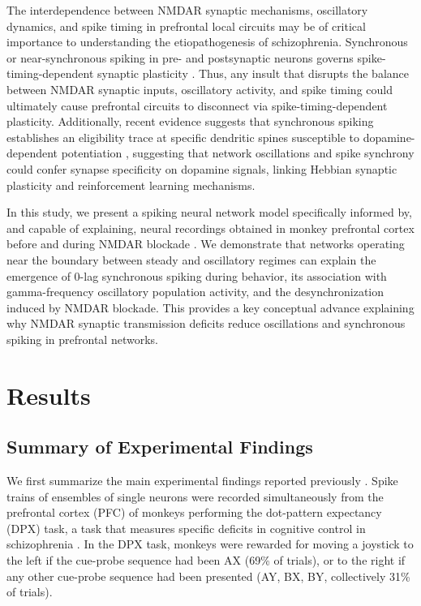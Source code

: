 \documentclass[12pt]{article}
\begin{document}
The interdependence between NMDAR synaptic mechanisms, oscillatory dynamics, and spike timing in prefrontal local circuits may be of critical importance to understanding the etiopathogenesis of schizophrenia. Synchronous or near-synchronous spiking in pre- and postsynaptic neurons governs spike-timing-dependent synaptic plasticity \citep{DanPoo2004}. Thus, any insult that disrupts the balance between NMDAR synaptic inputs, oscillatory activity, and spike timing could ultimately cause prefrontal circuits to disconnect via spike-timing-dependent plasticity. Additionally, recent evidence suggests that synchronous spiking establishes an eligibility trace at specific dendritic spines susceptible to dopamine-dependent potentiation \citep{He2015, Kasai2021, Yagishita2014}, suggesting that network oscillations and spike synchrony could confer synapse specificity on dopamine signals, linking Hebbian synaptic plasticity and reinforcement learning mechanisms.

In this study, we present a spiking neural network model specifically informed by, and capable of explaining, neural recordings obtained in monkey prefrontal cortex before and during NMDAR blockade \citep{Zick2018}. We demonstrate that networks operating near the boundary between steady and oscillatory regimes can explain the emergence of 0-lag synchronous spiking during behavior, its association with gamma-frequency oscillatory population activity, and the desynchronization induced by NMDAR blockade. This provides a key conceptual advance explaining why NMDAR synaptic transmission deficits reduce oscillations and synchronous spiking in prefrontal networks.

\section{Results}

\subsection{Summary of Experimental Findings}

We first summarize the main experimental findings reported previously \citep{Zick2018}. Spike trains of ensembles of single neurons were recorded simultaneously from the prefrontal cortex (PFC) of monkeys performing the dot-pattern expectancy (DPX) task, a task that measures specific deficits in cognitive control in schizophrenia \citep{Jones2010}. In the DPX task, monkeys were rewarded for moving a joystick to the left if the cue-probe sequence had been AX (69\% of trials), or to the right if any other cue-probe sequence had been presented (AY, BX, BY, collectively 31\% of trials).
\end{document}
